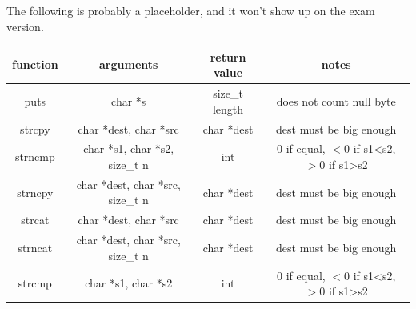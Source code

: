 \documentclass[letterpaper,12pt]{exam}
\begin{document}
\vspace{0.5in}
The following is probably a placeholder, and it won't show up on the exam version.\\
\begin{tabular}{|c|c|c|c|}
    \hline
   function & arguments & return value & notes\\    
    \hline
    puts & char *s & size\_t length & does not count null byte \\
    \hline
    strcpy & char *dest, char *src & char *dest & dest must be big enough \\
    \hline
    strncmp & char *s1, char *s2, size\_t n & int & 0 if equal, $<$0 if s1<s2, $>$0 if s1>s2 \\
    \hline
    strncpy & char *dest, char *src, size\_t n & char *dest & dest must be big enough \\
    \hline
    strcat & char *dest, char *src & char *dest & dest must be big enough \\
    \hline
    strncat & char *dest, char *src, size\_t n & char *dest & dest must be big enough \\
    \hline
    strcmp & char *s1, char *s2 & int & 0 if equal, $<$0 if s1<s2, $>$0 if s1>s2 \\
    \hline
\end{tabular}
\end{document}
